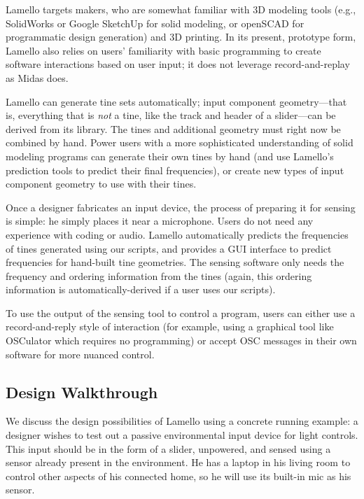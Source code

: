     Lamello targets makers, who are somewhat familiar with 3D modeling tools (e.g., SolidWorks or Google SketchUp for solid modeling, or openSCAD for programmatic design generation) and 3D printing. In its present, prototype form, Lamello also relies on users' familiarity with basic programming to create software interactions based on user input; it does not leverage record-and-replay as Midas does.
    
    Lamello can generate tine sets automatically; input component geometry---that is, everything that is \emph{not} a tine, like the track and header of a slider---can be derived from its library. The tines and additional geometry must right now be combined by hand. Power users with a more sophisticated understanding of solid modeling programs can generate their own tines by hand (and use Lamello's prediction tools to predict their final frequencies), or create new types of input component geometry to use with their tines.
    
    Once a designer fabricates an input device, the process of preparing it for sensing is simple: he simply places it near a microphone. Users do not need any experience with coding or audio. Lamello automatically predicts the frequencies of tines generated using our scripts, and provides a GUI interface to predict frequencies for hand-built tine geometries. The sensing software only needs the frequency and ordering information from the tines (again, this ordering information is automatically-derived if a user uses our scripts).
    
    To use the output of the sensing tool to control a program, users can either use a record-and-reply style of interaction (for example, using a graphical tool like OSCulator which requires no programming) or accept OSC messages in their own software for more nuanced control.
    
    \subsection{Design Walkthrough}
    
    We discuss the design possibilities of Lamello using a concrete running example: a designer wishes to test out a passive environmental input device for light controls. This input should be in the form of a slider, unpowered, and sensed using a sensor already present in the environment. He has a laptop in his living room to control other aspects of his connected home, so he will use its built-in mic as his sensor.
    
